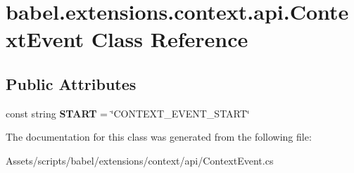 \hypertarget{classbabel_1_1extensions_1_1context_1_1api_1_1_context_event}{\section{babel.\-extensions.\-context.\-api.\-Context\-Event Class Reference}
\label{classbabel_1_1extensions_1_1context_1_1api_1_1_context_event}
}
\subsection*{Public Attributes}
\begin{DoxyCompactItemize}
\item 
\hypertarget{classbabel_1_1extensions_1_1context_1_1api_1_1_context_event_a6db843d4c09adfe3bc9ffc85e84a5674}{const string {\bfseries S\-T\-A\-R\-T} = \char`\"{}C\-O\-N\-T\-E\-X\-T\-\_\-\-E\-V\-E\-N\-T\-\_\-\-S\-T\-A\-R\-T\char`\"{}}\label{classbabel_1_1extensions_1_1context_1_1api_1_1_context_event_a6db843d4c09adfe3bc9ffc85e84a5674}

\end{DoxyCompactItemize}


The documentation for this class was generated from the following file\-:\begin{DoxyCompactItemize}
\item 
Assets/scripts/babel/extensions/context/api/Context\-Event.\-cs\end{DoxyCompactItemize}
